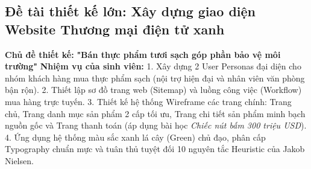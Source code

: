 \documentclass[11pt,a4paper,oneside]{report}
\begin{document}
\subsection{Đề tài thiết kế lớn: Xây dựng giao diện Website Thương mại điện tử xanh}
\begin{myquote}
\textbf{Chủ đề thiết kế:} \textbf{"Bán thực phẩm tươi sạch góp phần bảo vệ môi trường"}
\textbf{Nhiệm vụ của sinh viên:}
1. Xây dựng 2 User Personas đại diện cho nhóm khách hàng mua thực phẩm sạch (nội trợ hiện đại và nhân viên văn phòng bận rộn).
2. Thiết lập sơ đồ trang web (Sitemap) và luồng công việc (Workflow) mua hàng trực tuyến.
3. Thiết kế hệ thống Wireframe các trang chính: Trang chủ, Trang danh mục sản phẩm 2 cấp tối ưu, Trang chi tiết sản phẩm minh bạch nguồn gốc và Trang thanh toán (áp dụng bài học \textit{Chiếc nút bấm 300 triệu USD}).
4. Ứng dụng hệ thống màu sắc xanh lá cây (Green) chủ đạo, phân cấp Typography chuẩn mực và tuân thủ tuyệt đối 10 nguyên tắc Heuristic của Jakob Nielsen.
\end{myquote}
\end{document}
